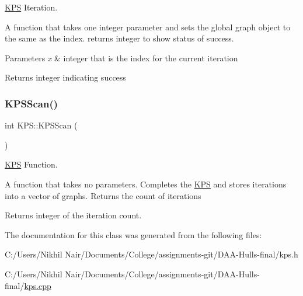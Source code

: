 \mbox{\hyperlink{class_k_p_s}{K\+PS}} Iteration. 

A function that takes one integer parameter and sets the global graph object to the same as the index. returns integer to show status of success. 
\begin{DoxyParams}{Parameters}
{\em x} & integer that is the index for the current iteration \\
\hline
\end{DoxyParams}
\begin{DoxyReturn}{Returns}
integer indicating success 
\end{DoxyReturn}
\mbox{\label{class_k_p_s_a539e5edac3833f7b2c79398c93543d4e}} 
\subsubsection{\texorpdfstring{KPSScan()}{KPSScan()}}
{\footnotesize\ttfamily int K\+P\+S\+::\+K\+P\+S\+Scan (\begin{DoxyParamCaption}{ }\end{DoxyParamCaption})\hspace{0.3cm}{\ttfamily [static]}}



\mbox{\hyperlink{class_k_p_s}{K\+PS}} Function. 

A function that takes no parameters. Completes the \mbox{\hyperlink{class_k_p_s}{K\+PS}} and stores iterations into a vector of graphs. Returns the count of iterations

\begin{DoxyReturn}{Returns}
integer of the iteration count. 
\end{DoxyReturn}


The documentation for this class was generated from the following files\+:\begin{DoxyCompactItemize}
\item 
C\+:/\+Users/\+Nikhil Nair/\+Documents/\+College/assignments-\/git/\+D\+A\+A-\/\+Hulls-\/final/kps.\+h\item 
C\+:/\+Users/\+Nikhil Nair/\+Documents/\+College/assignments-\/git/\+D\+A\+A-\/\+Hulls-\/final/\mbox{\hyperlink{kps_8cpp}{kps.\+cpp}}\end{DoxyCompactItemize}

